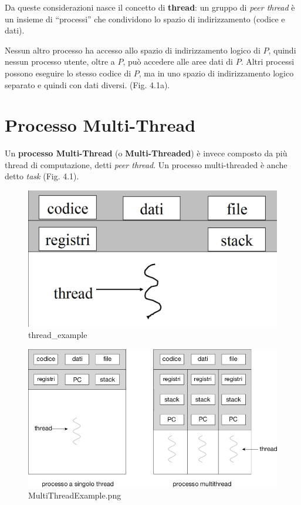 Da queste considerazioni nasce il concetto di \textbf{thread}: un gruppo di \textit{peer thread} è un insieme di “processi” che condividono lo spazio di indirizzamento (codice e dati).


Nessun altro processo ha accesso allo spazio di indirizzamento logico di $P$, quindi nessun processo utente, oltre a $P$, può accedere alle aree dati di $P$. Altri processi possono eseguire lo stesso codice di $P$, ma in uno spazio di indirizzamento logico separato e quindi con dati diversi. (Fig. 4.1a).

\section{Processo Multi-Thread}
Un \textbf{processo Multi-Thread} (o \textbf{Multi-Threaded}) è invece composto da più thread di computazione, detti \textit{peer thread}. Un processo multi-threaded è anche detto \textit{task} (Fig. 4.1).
\begin{figure}[h] \centering \includegraphics[width=0.50\linewidth]{images/thread_example.png} \caption{thread_example} \label{fig:4.1a} \end{figure}

\begin{figure}[h] \centering \includegraphics[width=0.50\linewidth]{images/MultiThreadExample.png} \caption{MultiThreadExample.png} \label{fig:4.2} \end{figure}

